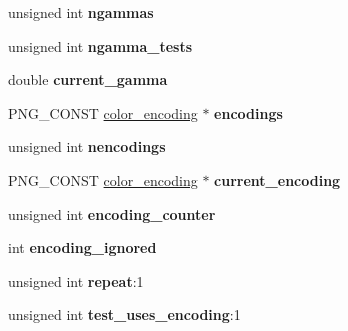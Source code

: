 \begin{DoxyCompactItemize}
\item 
\hypertarget{structpng__modifier_a1c5a4475c6b3e47517ba1a5f66092011}{unsigned int {\bfseries ngammas}}\label{structpng__modifier_a1c5a4475c6b3e47517ba1a5f66092011}

\item 
\hypertarget{structpng__modifier_a55eefeee4a527137f74a6489a21ca600}{unsigned int {\bfseries ngamma\+\_\+tests}}\label{structpng__modifier_a55eefeee4a527137f74a6489a21ca600}

\item 
\hypertarget{structpng__modifier_a511c0981518e9b57b031b642699e6002}{double {\bfseries current\+\_\+gamma}}\label{structpng__modifier_a511c0981518e9b57b031b642699e6002}

\item 
\hypertarget{structpng__modifier_a5bd05562023c3b471d48594e6ad6a690}{P\+N\+G\+\_\+\+C\+O\+N\+S\+T \hyperlink{structcolor__encoding}{color\+\_\+encoding} $\ast$ {\bfseries encodings}}\label{structpng__modifier_a5bd05562023c3b471d48594e6ad6a690}

\item 
\hypertarget{structpng__modifier_a2c5182a365951207b57eef96974ec839}{unsigned int {\bfseries nencodings}}\label{structpng__modifier_a2c5182a365951207b57eef96974ec839}

\item 
\hypertarget{structpng__modifier_a0a43c08f80bf7ecc1e3f310a82c262bd}{P\+N\+G\+\_\+\+C\+O\+N\+S\+T \hyperlink{structcolor__encoding}{color\+\_\+encoding} $\ast$ {\bfseries current\+\_\+encoding}}\label{structpng__modifier_a0a43c08f80bf7ecc1e3f310a82c262bd}

\item 
\hypertarget{structpng__modifier_a3f5f187336fbf7fda96ce6e6cf59d3dc}{unsigned int {\bfseries encoding\+\_\+counter}}\label{structpng__modifier_a3f5f187336fbf7fda96ce6e6cf59d3dc}

\item 
\hypertarget{structpng__modifier_a4ebffa684712f54a41658e91f7f06560}{int {\bfseries encoding\+\_\+ignored}}\label{structpng__modifier_a4ebffa684712f54a41658e91f7f06560}

\item 
\hypertarget{structpng__modifier_afee667cf455815a9e4b6925401b0dcc6}{unsigned int {\bfseries repeat}\+:1}\label{structpng__modifier_afee667cf455815a9e4b6925401b0dcc6}

\item 
\hypertarget{structpng__modifier_a1843dfdde09e16ad30577e3ede2cef23}{unsigned int {\bfseries test\+\_\+uses\+\_\+encoding}\+:1}\label{structpng__modifier_a1843dfdde09e16ad30577e3ede2cef23}


\end{DoxyCompactItemize}
